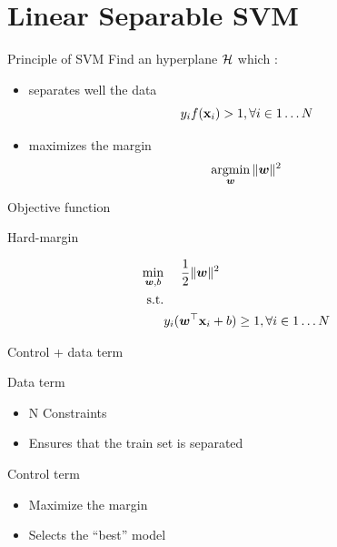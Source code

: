 \documentclass[11pt, pdf, compress, handout]{beamer}
\begin{document}
\section{Linear Separable SVM}
\begin{frame}[plain]
\end{frame}
\label{sec:orge152145}
\begin{frame}{Principle of SVM}
  Find an hyperplane ${\mathcal{H}}$ which :
    \begin{itemize}
    \item separates well the data
      $$
      y_i f({\mathbf{x}}_i) > 1, \forall i \in 1 \dots N
      $$
    \item maximizes the margin
      $$
      \operatorname*{argmin}_{\boldsymbol{w}} \| {\boldsymbol{w}} \|^2
      $$
    \end{itemize}
\end{frame}
\begin{frame}[label={sec:orgc76d99b}]{Objective function}
  \begin{block}{Hard-margin}
    \large{
      \begin{center}
        \begin{align*}
          \min_{{\boldsymbol{w}},b}& ~~~~  \frac{1}{2} \| {\boldsymbol{w}} \|^2  \\
          \text{s.t.} & \\
          &  y_i({\boldsymbol{w}}^\top {\mathbf{x}}_i + b) \geq 1, \forall i \in 1 \dots N 
        \end{align*}
  
    \end{center}
  }
\end{block}

\end{frame}
\begin{frame}{Control + data term}
  \begin{block}{Data term}
  \begin{itemize}
  \item N Constraints
  \item Ensures that the train set is separated
    \end{itemize}
  \end{block}
  \hfill
  \begin{block}{Control term}
    \begin{itemize}
    \item Maximize the margin
    \item Selects the ``best'' model
    \end{itemize}
    
  \end{block}
  
\end{frame}
\end{document}
